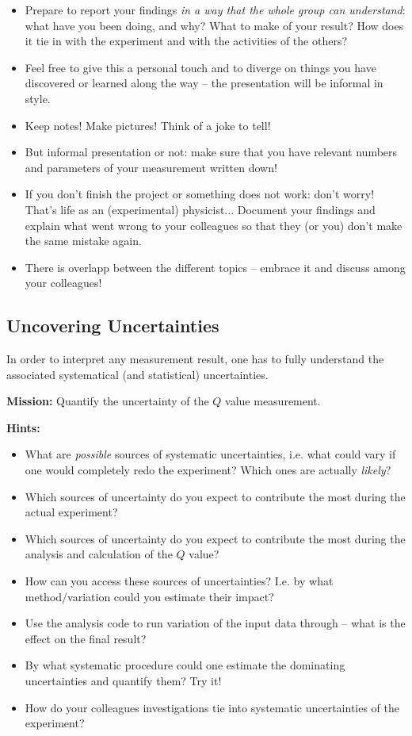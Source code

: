 \documentclass[a4,11pt, notitlepage]{article}
\begin{document}
\begin{itemize}
\item Prepare to report your findings \emph{in a way that the
    whole group can understand}: what have you been doing, and why?
  What to make of your result? How does it tie in with the experiment
  and with the activities of the others?
\item Feel free to give this a personal touch and to diverge on things
  you have discovered or learned along the way -- the presentation
  will be informal in style.
\item Keep notes! Make pictures! Think of a joke to tell!
\item But informal presentation or not: make sure that you have
  relevant numbers and parameters of your measurement written down!
\item If you don't finish the project or something does not work:
  don't worry! That's life as an (experimental) physicist... Document
  your findings and explain what went wrong to your colleagues so that
  they (or you) don't make the same mistake again.
\item There is overlapp between the different topics -- embrace it and
  discuss among your colleagues!
\end{itemize}

\subsection{Uncovering Uncertainties}
\label{sec:uncertainties}

In order to interpret any measurement result, one has to fully
understand the associated systematical (and statistical)
uncertainties.

\noindent\textbf{Mission:} Quantify the uncertainty of the $Q$ value measurement.

\noindent\textbf{Hints:}
\begin{itemize}
\item What are \emph{possible} sources of systematic uncertainties, i.e. what
  could vary if one would completely redo the experiment?
  Which ones are actually \emph{likely}?
\item Which sources of uncertainty do you expect to contribute the
  most during the actual experiment?
\item Which sources of uncertainty do you expect to contribute the
  most during the analysis and calculation of the $Q$ value?
\item How can you access these sources of uncertainties? I.e. by what
  method/variation could you estimate their impact?
\item Use the analysis code to run variation of the input data through
  -- what is the effect on the final result?
\item By what systematic procedure could one estimate the dominating
  uncertainties and quantify them? Try it!
\item How do your colleagues investigations tie into systematic
  uncertainties of the experiment?
\end{itemize}
\end{document}
